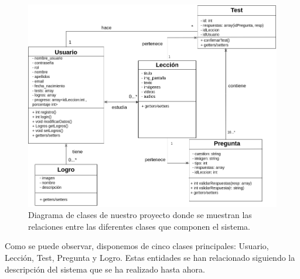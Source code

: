 \begin{figure}[H]
    \centering
    \centerline{\includegraphics[width=1\textwidth]{imagenes/c5/diagramadeclases.png}}
    \caption{Diagrama de clases de nuestro proyecto donde se muestran las relaciones entre las diferentes clases que componen el sistema.}
    \label{fig:diagramadeclases}    
\end{figure}

Como se puede observar, disponemos de cinco clases principales: Usuario, Lección, Test, Pregunta y Logro. Estas entidades se han relacionado siguiendo 
la descripción del sistema que se ha realizado hasta ahora.